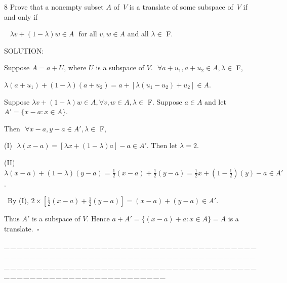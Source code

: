 \documentclass[a4paper, 11pt, UTF8]{article}
\begin{document}
\begin{large}
{\timesbf\Large 8} {\timessl\Large 
Prove that a nonempty subset $A$ of \,$V$ is a translate of some subspace of \,$V$ if and only if}\par\,\,\,
{\timessl\Large $\lambda v+(1-\lambda)w\in A\,\,$ for all $v,w\in A$ and all $\lambda\in$ {\timesbf F}.
}\par
{\timesbf S\footnotesize{OLUTION:}}\par\quad
Suppose $A=a+U$, where $U$ is a subspace of $V$. $\,\,\forall a+u_1,a+u_2\in A,\lambda\in$ {\timesbf F},\par\quad
$\lambda(a+u_1)+(1-\lambda)(a+u_2)=a+[\lambda(u_1-u_2)+u_2]\in A$.\par\quad
Suppose $\lambda v+(1-\lambda)w\in A,\forall v,w\in A,\lambda\in$ {\timesbf F}. Suppose $a\in A$ and let $A'=\{x-a:x\in A\}$.\par\quad
Then $\,\,\forall x-a,y-a\in A',\lambda\in$ {\timesbf F},\par\quad
(I) \,\,$\lambda(x-a)=[\lambda x+(1-\lambda)a]-a\in A'.$ Then let $\lambda=2$.\par\quad
(II) $\lambda(x-a)+(1-\lambda)(y-a)=\frac{1}{2}(x-a)+\frac{1}{2}(y-a)=\frac{1}{2}x+(1-\frac{1}{2})(y)-a\in A'$.\par\qquad\,
By (I), $2\times[\frac{1}{2}(x-a)+\frac{1}{2}(y-a)]=(x-a)+(y-a)\in A'$.\par\quad
Thus $A'$ is a subspace of $V$. Hence $a+A'=\{(x-a)+a:x\in A\}=A$ is a translate.$\,\,\,\square$\par
{\tiny \_\,\_\,\_\,\_\,\_\,\_\,\_\,\_\,\_\,\_\,\_\,\_\,\_\,\_\,\_\,\_\,\_\,\_\,\_\,\_\,\_\,\_\,\_\,\_\,\_\,\_\,\_\,\_\,\_\,\_\,\_\,\_\,\_\,\_\,\_\,\_\,\_\,\_\,\_\,\_\,\_\,\_\,\_\,\_\,\_\,\_\,\_\,\_\,\_\,\_\,\_\,\_\,\_\,\_\,\_\,\_\,\_\,\_\,\_\,\_\,\_\,\_\,\_\,\_\,\_\,\_\,\_\,\_\,\_\,\_\,\_\_\,\_\,\_\,\_\,\_\,\_\,\_\,\_\,\_\,\_\,\_\,\_\,\_\,\_\,\_\,\_\,\_\,\_\,\_\,\_\,\_\,\_\,\_\,\_\,\_\,\_\,\_\,\_\,\_\,\_\,\_\,\_\,\_\,\_\,\_\,\_\,\_\,\_\,\_\,\_\,\_\,\_\,\_\,\_\,\_\,\_\,\_\,\_\,\_\,\_\,\_\,\_\,\_\,\_\,\_\,\_\,\_\,\_\,\_\,\_\,\_\,\_\,\_\,\_\,\_\,\_\,\_\,\_\,\_\,\_\,\_}{\tiny\,\par}


\end{large}
\end{document}

